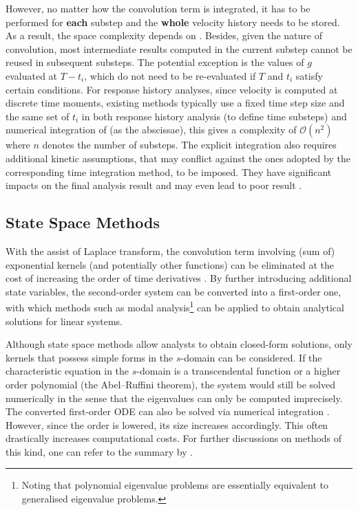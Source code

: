 However, no matter how the convolution term is integrated, it has to be performed for \textbf{each} substep and the \textbf{whole} velocity history needs to be stored. As a result, the space complexity depends on . Besides, given the nature of convolution, most intermediate results computed in the current substep cannot be reused in subsequent substeps. The potential exception is the values of $g$ evaluated at $T-t_i$, which do not need to be re-evaluated if $T$ and $t_i$ satisfy certain conditions. For response history analyses, since velocity is computed at discrete time moments, existing methods typically use a fixed time step size and the same set of $t_i$ in both response history analysis (to define time substeps) and numerical integration of  (as the abscissae), this gives a complexity of $\mathcal{O}\left(n^2\right)$ where $n$ denotes the number of substeps. The explicit integration also requires additional kinetic assumptions, that may conflict against the ones adopted by the corresponding time integration method, to be imposed. They have significant impacts on the final analysis result \citep[see][]{Liu2014} and may even lead to poor result \cite[see][Figs. 12, 17, 25, 26]{Liu2023}.
\subsection{State Space Methods}
With the assist of Laplace transform, the convolution term involving (sum of) exponential kernels (and potentially other functions) can be eliminated at the cost of increasing the order of time derivatives \citep[see, e.g.,][]{Wu2019}. By further introducing additional state variables, the second-order system  can be converted into a first-order one, with which methods such as modal analysis\footnote{Noting that polynomial eigenvalue problems are essentially equivalent to generalised eigenvalue problems.} can be applied to obtain analytical solutions for linear systems.

Although state space methods allow analysts to obtain closed-form solutions, only kernels that possess simple forms in the $s$-domain can be considered. If the characteristic equation in the $s$-domain is a transcendental function or a higher order polynomial (the Abel--Ruffini theorem), the system would still be solved numerically in the sense that the eigenvalues can only be computed imprecisely. The converted first-order ODE can also be solved via numerical integration \citep{Adhikari2004,Ding2016}.  However, since the order is lowered, its size increases accordingly. This often drastically increases computational costs. For further discussions on methods of this kind, one can refer to the summary by \citet[][\S~1.3.1]{Adhikari2014}.
